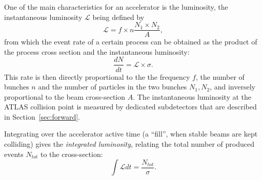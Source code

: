 One of the main characteristics for an accelerator is the luminosity, the 
instantaneous luminosity $\mathcal L$ being defined by 
\begin{equation}\label{eq:lumiN}
\mathcal{L}=f\times n\dfrac{N_1\times N_2}{A},
\end{equation} 
from which the event rate of a certain process can be
obtained as the product of the process cross section
and the instantaneous luminosity:
\begin{equation}\label{eq:evtrate}
\dfrac{dN}{dt}=\mathcal{L}\times\sigma.
\end{equation} 
This rate is then directly proportional to the the frequency $f$, the number 
of bunches $n$ and the number of particles in the two bunches $N_1, N_2$, and
inversely proportional to the beam cross-section $A$.
The instantaneous luminosity at the ATLAS 
collision point is measured by dedicated subdetectors that are
described in Section~\ref{sec:forward}.

Integrating over the accelerator active time (a ``fill'', when stable beams are kept
colliding) gives the \textit{integrated luminosity}, relating the total number 
of produced events $N_{tot}$ to the cross-section:
\begin{equation}\label{eq:intLumi}
\int \mathcal L dt  = \dfrac{N_{tot}}{\sigma}.
\end{equation}





